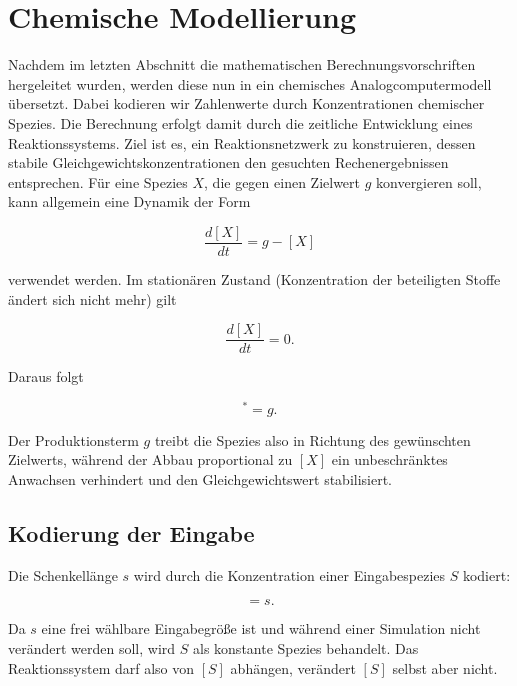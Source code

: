 \section{Chemische Modellierung}

Nachdem im letzten Abschnitt die mathematischen Berechnungsvorschriften hergeleitet wurden, werden diese nun in ein chemisches Analogcomputermodell übersetzt. Dabei kodieren wir Zahlenwerte durch Konzentrationen chemischer Spezies. Die Berechnung erfolgt damit durch die zeitliche Entwicklung eines Reaktionssystems. Ziel ist es, ein Reaktionsnetzwerk zu konstruieren, dessen stabile Gleichgewichtskonzentrationen den gesuchten Rechenergebnissen entsprechen. Für eine Spezies \(X\), die gegen einen Zielwert \(g\) konvergieren soll, kann allgemein eine Dynamik der Form

\begin{equation}
    \frac{d[X]}{dt}
    =
    g - [X]
\end{equation}

verwendet werden. Im stationären Zustand (Konzentration der beteiligten Stoffe ändert sich nicht mehr) gilt

\begin{equation}
    \frac{d[X]}{dt}=0.
\end{equation}

Daraus folgt

\begin{equation}
    [X]^*=g.
\end{equation}

Der Produktionsterm \(g\) treibt die Spezies also in Richtung des
gewünschten Zielwerts, während der Abbau proportional zu \([X]\) ein
unbeschränktes Anwachsen verhindert und den Gleichgewichtswert stabilisiert.

\subsection{Kodierung der Eingabe}

Die Schenkellänge \(s\) wird durch die Konzentration einer Eingabespezies
\(S\) kodiert:

\begin{equation}
    [S]=s.
\end{equation}

Da \(s\) eine frei wählbare Eingabegröße ist und während einer Simulation
nicht verändert werden soll, wird \(S\) als konstante Spezies behandelt.
Das Reaktionssystem darf also von \([S]\) abhängen, verändert \([S]\)
selbst aber nicht. 

